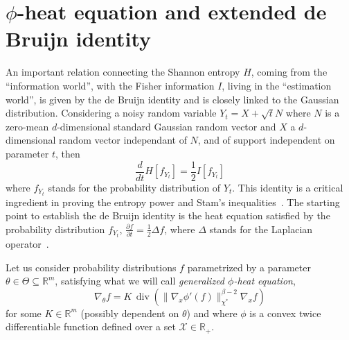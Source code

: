 \documentclass[english,sort&compress]{elsarticle}
\theoremstyle{definition}
\theoremstyle{plain}
\theoremstyle{plain}
\def\Rset{\mathbb{R}}
\def\X{\mathcal{X}}
\def\div{\operatorname{div}}
\begin{document}

\section{$\phi$-heat equation and extended de Bruijn identity}
\label{sec:deBruijn}


An important relation connecting the Shannon entropy $H$, coming from the ``information world'', with the Fisher information $I$, living in the ``estimation world'', is given by the de Bruijn identity and is closely linked to the Gaussian distribution. Considering a noisy random variable $Y_t = X + \sqrt{t} N$ where $N$ is a zero-mean $d$-dimensional standard Gaussian random vector and $X$ a $d$-dimensional random vector independant of $N$, and of support independent on parameter $t$, then $$\frac{d}{dt} H[f_{Y_t}] = \frac12 I[f_{Y_t}]$$ where $f_{Y_t}$ stands for the probability distribution of $Y_t$.
This identity is a critical ingredient in proving the entropy power and Stam's inequalities~\cite{CovTho06}. 
The starting point to establish the de Bruijn identity is the heat equation satisfied by the probability distribution $f_{Y_t}$, $\frac{\partial f}{\partial t} = \frac12 \Delta f$, where $\Delta$ stands for the Laplacian operator~\cite{Wid75}.


Let us consider probability
distributions  $f$ parametrized  by  a parameter  $\theta  \in \Theta  \subseteq
\Rset^m$, satisfying what we will call {\em generalized $\phi$-heat equation},
%
\begin{equation}
\label{eq:phi-heat_equation}
\nabla_\theta f = K \, \div\left( \| \nabla_x \phi'(f) \|_{\chi^*}^{\beta-2}
\nabla_x f \right)
\end{equation}
%
for some $K \in \Rset^m$ (possibly  dependent on $\theta$) and where $\phi$ is a
convex  twice differentiable  function  defined  over a  set  $\X \in  \Rset_+$.
\end{document}
